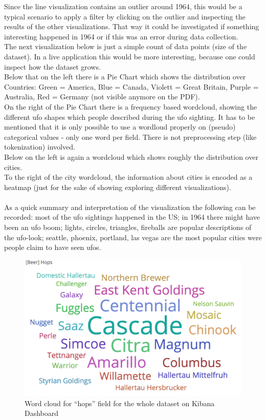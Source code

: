 \documentclass[bibliography=totoc]{article}
\begin{document}
Since the line visualization contains an outlier around 1964, this would
be a typical scenario to apply a filter by clicking on the outlier and inspecting the results of the other visualizations. That way
it could be investigated if something interesting happened in 1964 or if this was
an error during data collection.
\\
The next visualization below is just a simple count of data points (size of the dataset). 
In a live application this would be more interesting, because one could inspect how the 
dataset grows.
\\
Below that on the left there is a Pie Chart which shows the distribution over Countries:
Green = America, Blue = Canada, Violett = Great Britain, Purple = Australia, Red = Germany (not visible anymore on the PDF).
\\
On the right of the Pie Chart there is a frequency based wordcloud, showing the different ufo shapes which 
people described during the ufo sighting. It has to be mentioned that it is only possible to
use a wordloud properly on (pseudo) categorical values - only one word per field. There is not preprocessing step
(like tokenization) involved.
\\
Below on the left is again a wordcloud which shows roughly the distribution over cities.
\\
To the right of the city wordcloud, the information about cities is encoded as a 
heatmap (just for the sake of showing exploring different visualizations).
\\
\\
As a quick summary and interpretation of the visualization the following can 
be recorded: most of the ufo sightings happened in the US; in 1964 there might have been 
an ufo boom; lights, circles, triangles, fireballs are popular descriptions of the ufo-look;
seattle, phoenix, portland, las vegas are the most popular cities were people claim to have seen ufos.


\begin{figure}
  \centering
  \includegraphics[width=\linewidth]{beer_hops.png}
 \caption{Word cloud for ``hops'' field for the whole dataset on Kibana Dashboard}
  \label{fig:beer_hops}
\end{figure}
\end{document}
